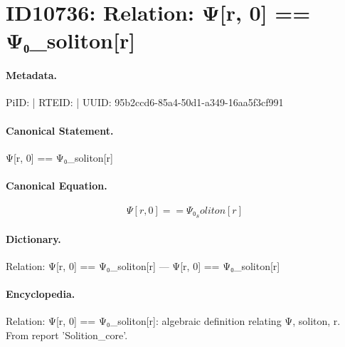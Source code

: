 \section*{ID10736: Relation: Ψ[r, 0] == Ψ₀\_soliton[r]}
\paragraph{Metadata.}
PiID:  | RTEID:  | UUID: 95b2ccd6-85a4-50d1-a349-16aa5f3cf991

\paragraph{Canonical Statement.}
Ψ[r, 0] == Ψ₀\_soliton[r]

\paragraph{Canonical Equation.}
\[
Ψ[r, 0] == Ψ₀_soliton[r]
\]

\paragraph{Dictionary.}
Relation: Ψ[r, 0] == Ψ₀\_soliton[r] — Ψ[r, 0] == Ψ₀\_soliton[r]

\paragraph{Encyclopedia.}
Relation: Ψ[r, 0] == Ψ₀\_soliton[r]: algebraic definition relating Ψ, soliton, r. From report 'Solition\_core'.
